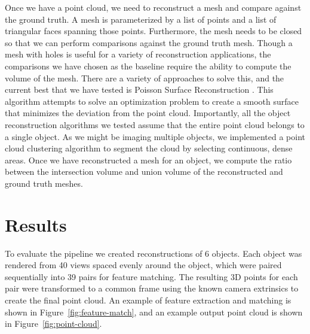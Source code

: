 \documentclass[12pt,letterpaper]{article} %
\begin{document}
Once we have a point cloud, we need to reconstruct a mesh and compare against the ground truth.  A mesh is parameterized by a list of points and a list of triangular faces spanning those points.  Furthermore, the mesh needs to be closed so that we can perform comparisons against the ground truth mesh.  Though a mesh with holes is useful for a variety of reconstruction applications, the comparisons we have chosen as the baseline require the ability to compute the volume of the mesh.  There are a variety of approaches to solve this, and the current best that we have tested is Poisson Surface Reconstruction \cite{10.5555/1281957.1281965}.  This algorithm attempts to solve an optimization problem to create a smooth surface that minimizes the deviation from the point cloud.  Importantly, all the object reconstruction algorithms we tested assume that the entire point cloud belongs to a single object. As we might be imaging multiple objects, we implemented a point cloud clustering algorithm to segment the cloud by selecting continuous, dense areas.  Once we have reconstructed a mesh for an object, we compute the ratio between the intersection volume and union volume of the reconstructed and ground truth meshes.

\section{Results}
To evaluate the pipeline we created reconstructions of 6 objects.  Each object was rendered from 40 views spaced evenly around the object, which were paired sequentially into 39 pairs for feature matching.  The resulting 3D points for each pair were transformed to a common frame using the known camera extrinsics to create the final point cloud.  An example of feature extraction and matching is shown in Figure~\ref{fig:feature-match}, and an example output point cloud is shown in Figure~\ref{fig:point-cloud}.

\let\maybefbox\relax
\end{document}

